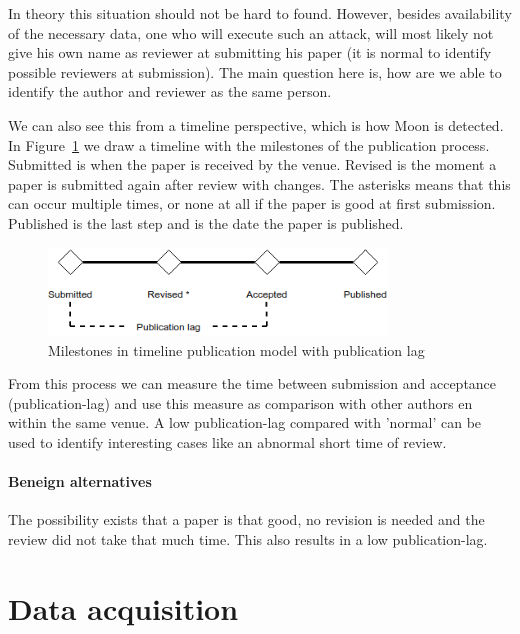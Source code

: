 \documentclass{ou-report}
\begin{document}
In theory this situation should not be hard to found. However, besides 
availability of the necessary data, one who will execute such an attack, will 
most likely not give his own name as reviewer at submitting his paper (it is 
normal to identify possible reviewers at submission). The main question here 
is, how are we able to identify the author and reviewer as the same person.

We can also see this from a timeline perspective, which is how Moon is 
detected. In Figure~\ref{fig:timeline} we draw a timeline with the milestones of 
the publication process. Submitted is when the paper is received by the venue. 
Revised is the moment a paper is submitted again after review with changes. The 
asterisks means that this can occur multiple times, or none at all if the paper 
is good at first submission. Published is the last step and is the date the 
paper is published.

\begin{figure}[H]
\centering
\includegraphics[width=9cm]{images/timeline.drawio.png}
\caption{Milestones in timeline publication model with publication lag}
\label{fig:timeline}
\end{figure}

From this process we can measure the time between submission and acceptance 
(publication-lag) and use this measure as comparison with other authors en within 
the same venue. A low publication-lag compared with 'normal' can be used to 
identify interesting cases like an abnormal short time of review.
\paragraph{Beneign alternatives}
The possibility exists that a paper is that good, no revision is needed and the 
review did not take that much time. This also results in a low publication-lag.



\section{Data acquisition}
\end{document}
